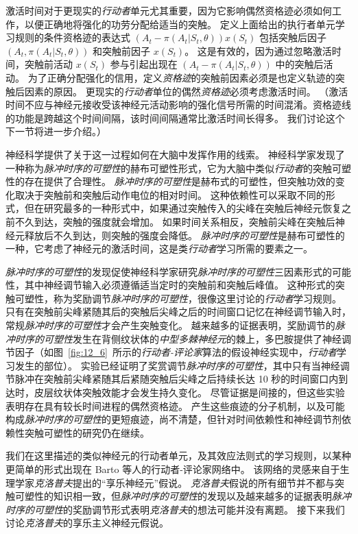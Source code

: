激活时间对于更现实的\textit{行动者}单元尤其重要，因为它影响偶然资格迹必须如何工作，以便正确地将强化的功劳分配给适当的突触。
定义上面给出的执行者单元学习规则的条件资格迹的表达式 $(A_t - \pi(A_t|S_t, \theta)) x(S_t)$ 包括突触后因子 $(A_t, \pi(A_t | S_t, \theta))$ 和突触前因子 $x(S_t)$。
这是有效的，因为通过忽略激活时间，突触前活动 $x(S_t)$ 参与引起出现在 $(A_t - \pi(A_t | S_t, \theta))$ 中的突触后活动。
为了正确分配强化的信用，定义\textit{资格迹}的突触前因素必须是也定义轨迹的突触后因素的原因。
更现实的\textit{行动者}单位的偶然\textit{资格迹}必须考虑激活时间。
（激活时间不应与神经元接收受该神经元活动影响的强化信号所需的时间混淆。资格迹线的功能是跨越这个时间间隔，该时间间隔通常比激活时间长得多。
我们讨论这个下一节将进一步介绍。）


神经科学提供了关于这一过程如何在大脑中发挥作用的线索。
神经科学家发现了一种称为\textit{脉冲时序的可塑性}的赫布可塑性形式，它为大脑中类似\textit{行动者}的突触可塑性的存在提供了合理性。
\textit{脉冲时序的可塑性}是赫布式的可塑性，但突触功效的变化取决于突触前和突触后动作电位的相对时间。
这种依赖性可以采取不同的形式，但在研究最多的一种形式中，如果通过突触传入的尖峰在突触后神经元恢复之前不久到达，突触的强度就会增加。
如果时间关系相反，突触前尖峰在突触后神经元释放后不久到达，则突触的强度会降低。
\textit{脉冲时序的可塑性}是赫布可塑性的一种，它考虑了神经元的激活时间，这是类\textit{行动者}学习所需的要素之一。


\textit{脉冲时序的可塑性}的发现促使神经科学家研究\textit{脉冲时序的可塑性}三因素形式的可能性，其中神经调节输入必须遵循适当定时的突触前和突触后峰值。
这种形式的突触可塑性，称为奖励调节\textit{脉冲时序的可塑性}，很像这里讨论的\textit{行动者}学习规则。
只有在突触前尖峰紧随其后的突触后尖峰之后的时间窗口记忆在神经调节输入时，常规\textit{脉冲时序的可塑性}才会产生突触变化。
越来越多的证据表明，奖励调节的\textit{脉冲时序的可塑性}发生在背侧纹状体的\textit{中型多棘神经元}的棘上，多巴胺提供了神经调节因子（如图~\ref{fig:12_6}~所示的\textit{行动者-评论家}算法的假设神经实现中，\textit{行动者}学习发生的部位）。
实验已经证明了奖赏调节\textit{脉冲时序的可塑性}，其中只有当神经调节脉冲在突触前尖峰紧随其后紧随突触后尖峰之后持续长达 10 秒的时间窗口内到达时，皮层纹状体突触效能才会发生持久变化\cite{yagishita2014critical}。
尽管证据是间接的，但这些实验表明存在具有较长时间进程的偶然资格迹。
产生这些痕迹的分子机制，以及可能构成\textit{脉冲时序的可塑性}的更短痕迹，尚不清楚，但针对时间依赖性和神经调节剂依赖性突触可塑性的研究仍在继续。


我们在这里描述的类似神经元的行动者单元，及其效应法则式的学习规则，以某种更简单的形式出现在 Barto 等人的行动者-评论家网络中\cite{barto13neuron}。
该网络的灵感来自于生理学家\textit{克洛普夫}提出的“享乐神经元”假说\cite{klopf1972brain,klopf1982hedonistic}。
\textit{克洛普夫}假说的所有细节并不都与突触可塑性的知识相一致，但\textit{脉冲时序的可塑性}的发现以及越来越多的证据表明\textit{脉冲时序的可塑性}的奖励调节形式表明\textit{克洛普夫}的想法可能并没有离题。
接下来我们讨论\textit{克洛普夫}的享乐主义神经元假说。



